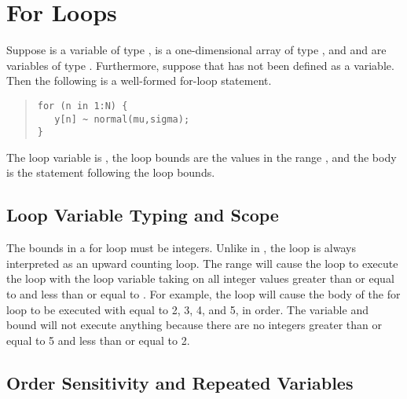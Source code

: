 

\section{For Loops}

Suppose
 is a variable of type ,  is a
one-dimensional array of type , and  and
 are variables of type .  Furthermore, suppose
that  has not been defined as a variable. Then the following
is a well-formed for-loop statement.
%
\begin{quote}
\begin{Verbatim}
for (n in 1:N) {
   y[n] ~ normal(mu,sigma);
}
\end{Verbatim}
\end{quote}
%
The loop variable is , the loop bounds are the values in the
range , and the body is the statement following the
loop bounds.  

\subsection{Loop Variable Typing and Scope}

The bounds in a for loop must be integers.  Unlike in \R, the loop is
always interpreted as an upward counting loop.  The range 
will cause the loop to execute the loop with the loop variable taking
on all integer values greater than or equal to  and less than
or equal to .  For example, the loop 
will cause the body of the for loop to be executed with  equal
to 2, 3, 4, and 5, in order.  The variable and bound  will not execute anything because there are no integers
greater than or equal to 5 and less than or equal to 2.

\subsection{Order Sensitivity and Repeated Variables}

